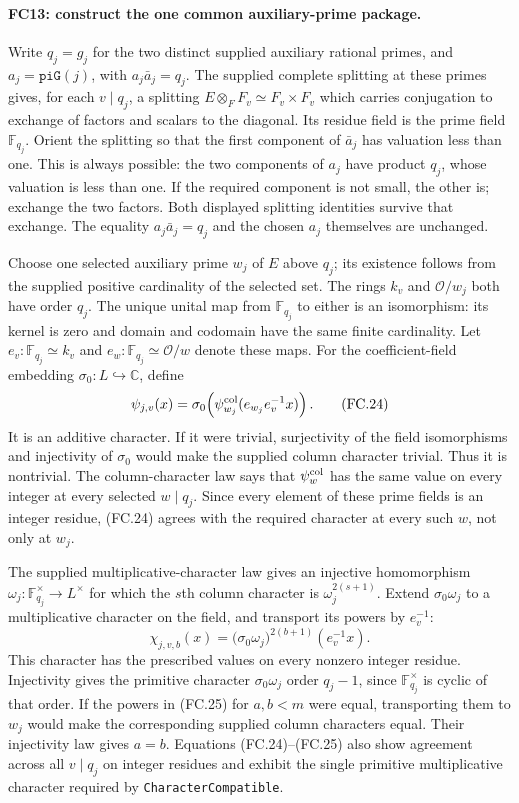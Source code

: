 \documentclass[11pt,a4paper]{article}
\numberwithin{equation}{section}
\theoremstyle{remark}\newtheorem{remark}[theorem]{Remark}
\begin{document}
\paragraph{FC13: construct the one common auxiliary-prime package.}
Write $q_j=g_j$ for the two distinct supplied auxiliary rational primes,
and $a_j=\texttt{piG}(j)$, with $a_j\bar a_j=q_j$.
The supplied complete splitting at these primes gives, for each
$v\mid q_j$, a splitting
$E\otimes_FF_v\simeq F_v\times F_v$ which carries conjugation
to exchange of factors and scalars to the diagonal. Its residue field
is the prime field $\mathbb F_{q_j}$. Orient the splitting so that the
first component of $\bar a_j$ has valuation less than one.
This is always possible: the two components of $a_j$ have product
$q_j$, whose valuation is less than one. If the required component is
not small, the other is; exchange the two factors. Both displayed
splitting identities survive that exchange. The equality
$a_j\bar a_j=q_j$ and the chosen $a_j$ themselves are unchanged.

Choose one selected auxiliary prime $w_j$ of $E$ above $q_j$; its
existence follows from the supplied positive cardinality of the selected
set. The rings $k_v$ and $\mathcal O/w_j$ both have order $q_j$.
The unique unital map from $\mathbb F_{q_j}$ to either is an
isomorphism: its kernel is zero and domain and codomain have the same
finite cardinality. Let $e_v:\mathbb F_{q_j}\simeq k_v$ and
$e_w:\mathbb F_{q_j}\simeq\mathcal O/w$ denote these maps.
For the coefficient-field embedding $\sigma_0:L\hookrightarrow\mathbb C$,
define
\[
 \psi_{j,v}(x)=\sigma_0\!\left(
       \psi^{\rm col}_{w_j}(e_{w_j}e_v^{-1}x)\right).
 \tag{FC.24}
\]
It is an additive character. If it were trivial, surjectivity of the
field isomorphisms and injectivity of $\sigma_0$ would make the supplied
column character trivial. Thus it is nontrivial. The column-character
law says that $\psi^{\rm col}_w$ has the same value on every integer
at every selected $w\mid q_j$. Since every element of these prime
fields is an integer residue, (FC.24) agrees with the required character
at every such $w$, not only at $w_j$.

The supplied multiplicative-character law gives an injective homomorphism
$\omega_j:\mathbb F_{q_j}^{\times}\to L^{\times}$ for which
the $s$th column character is $\omega_j^{2(s+1)}$.
Extend $\sigma_0\omega_j$ to a multiplicative character on the field,
and transport its powers by $e_v^{-1}$:
\[
 \chi_{j,v,b}(x)
       =\bigl(\sigma_0\omega_j\bigr)^{2(b+1)}(e_v^{-1}x).
 \tag{FC.25}
\]
This character has the prescribed values on every nonzero integer
residue. Injectivity gives the primitive character
$\sigma_0\omega_j$ order $q_j-1$, since
$\mathbb F_{q_j}^{\times}$ is cyclic of that order. If the powers
in (FC.25) for $a,b<m$ were equal, transporting them to $w_j$ would
make the corresponding supplied column characters equal. Their
injectivity law gives $a=b$. Equations (FC.24)--(FC.25) also show
agreement across all $v\mid q_j$ on integer residues and exhibit the
single primitive multiplicative character required by
\texttt{CharacterCompatible}.
\end{document}
